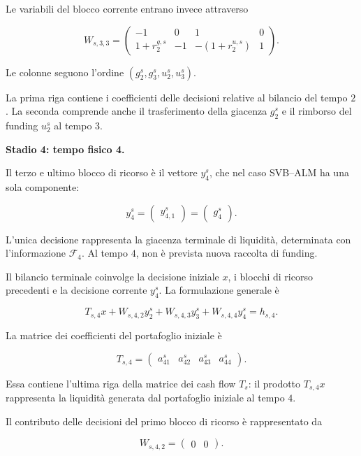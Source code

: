Le variabili del blocco corrente
entrano invece attraverso

\[
W_{s,3,3}
=
\begin{pmatrix}
-1&0&1&0\\
1+r_2^{g,s}&-1&-(1+r_2^{u,s})&1
\end{pmatrix}.
\]

Le colonne seguono l'ordine
$(g_2^s,g_3^s,u_2^s,u_3^s)$.

La prima riga contiene i coefficienti
delle decisioni relative al bilancio
del tempo $2$.
La seconda comprende anche
il trasferimento della giacenza $g_2^s$
e il rimborso del funding $u_2^s$
al tempo $3$.

\medskip

\medskip

\noindent
\textbf{Stadio 4: tempo fisico 4.}

Il terzo e ultimo blocco di ricorso \`e
il vettore $y_4^s$, che nel caso SVB--ALM
ha una sola componente:

\[
y_4^s
=
\begin{pmatrix}
y_{4,1}^s
\end{pmatrix}
=
\begin{pmatrix}
g_4^s
\end{pmatrix}.
\]

L'unica decisione rappresenta la giacenza
terminale di liquidit\`a, determinata
con l'informazione $\mathcal F_4$.
Al tempo $4$, non \`e prevista
nuova raccolta di funding.

Il bilancio terminale coinvolge la decisione
iniziale $x$, i blocchi di ricorso precedenti
e la decisione corrente $y_4^s$.
La formulazione generale \`e

\[
T_{s,4}x+
W_{s,4,2}y_2^s+
W_{s,4,3}y_3^s+
W_{s,4,4}y_4^s
=
h_{s,4}.
\]

La matrice dei coefficienti del portafoglio
iniziale \`e

\[
T_{s,4}
=
\begin{pmatrix}
a_{41}^s&a_{42}^s&a_{43}^s&a_{44}^s
\end{pmatrix}.
\]

Essa contiene l'ultima riga della matrice
dei cash flow $T_s$: il prodotto $T_{s,4}x$
rappresenta la liquidit\`a generata
dal portafoglio iniziale al tempo $4$.

Il contributo delle decisioni del primo
blocco di ricorso \`e rappresentato da

\[
W_{s,4,2}
=
\begin{pmatrix}
0&0
\end{pmatrix}.
\]

